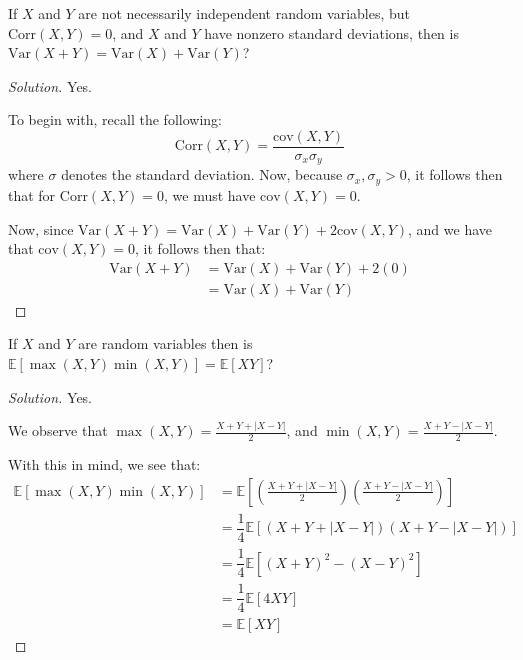 \documentclass{article}
\newenvironment{solution}{\begin{proof}[Solution]}{\end{proof}}
\newcommand{\E}{\mathbb{E}}
\newcommand{\Var}{\mathrm{Var}}
\newcommand{\cov}{\mathrm{cov}}
\newcommand{\corr}{\mathrm{Corr}}
\begin{document}
\begin{hw}
	If $X$ and $Y$ are not necessarily independent random variables, but $\corr (X, Y) = 0$, and $X$ and $Y$ have nonzero standard deviations, then is $\Var (X+Y) = \Var(X) + \Var(Y)$?
\end{hw}
\begin{solution}
	Yes.
	
	To begin with, recall the following:
	\begin{equation*}
		\corr(X,Y) = \dfrac{\cov(X,Y)}{\sigma_{x}\sigma_{y}}
	\end{equation*}
	where $\sigma$ denotes the standard deviation. Now, because $\sigma_{x}, \sigma_{y} > 0$, it follows then that for $\corr(X,Y) = 0$, we must have $\cov(X,Y) = 0$.
	
	Now, since $\Var(X+Y) = \Var(X) + \Var(Y) + 2\cov(X,Y)$, and we have that $\cov(X,Y) = 0$, it follows then that:
	\begin{align*}
		\Var(X+Y) &= \Var(X) + \Var(Y) + 2(0) \\
		&= \Var(X) + \Var(Y)
	\end{align*}
\end{solution}

\begin{hw}
	If $X$ and $Y$ are random variables then is $\E[\max (X, Y) \min (X, Y)] = \E[X Y]$?
\end{hw}
\begin{solution}
	Yes.
	
	We observe that $\max(X,Y) = \frac{X+Y+\lvert X-Y \rvert}{2}$, and $\min(X,Y) = \frac{X+Y-\lvert X-Y \rvert}{2}$.
	
	With this in mind, we see that:
	\begin{align*}
		\E[\max (X, Y) \min (X, Y)] &= \E\left[ \left( \frac{X+Y+\lvert X-Y \rvert}{2} \right) \left( \frac{X+Y-\lvert X-Y \rvert}{2} \right)\right] \\
		&= \dfrac{1}{4}\E[\left( X+Y+\lvert X-Y \rvert \right)\left( X+Y-\lvert X-Y \rvert \right)] \\
		&= \dfrac{1}{4}\E[\left( X+Y \right)^{2} - \left( X-Y \right)^{2}] \\
		&= \dfrac{1}{4}\E[4XY] \\
		&= \E[XY]
	\end{align*}
\end{solution}
\end{document}
